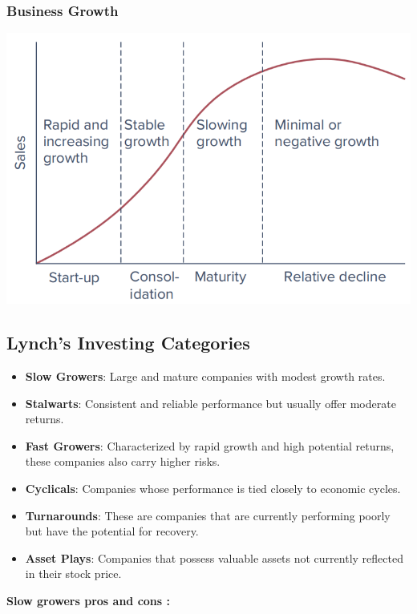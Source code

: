 \documentclass[
]{book}
\providecommand{\tightlist}{%
  \setlength{\itemsep}{0pt}\setlength{\parskip}{0pt}}
\begin{document}
\hypertarget{business-growth}{%
\subsubsection{Business Growth}\label{business-growth}}

\includegraphics{Resources/businesscycle.png}

\hypertarget{lynchs-investing-categories}{%
\subsection{Lynch's Investing Categories}\label{lynchs-investing-categories}}

\begin{itemize}
\tightlist
\item
  \textbf{Slow Growers}: Large and mature companies with modest growth rates.
\item
  \textbf{Stalwarts}: Consistent and reliable performance but usually offer moderate returns.
\item
  \textbf{Fast Growers}: Characterized by rapid growth and high potential returns, these companies also carry higher risks.
\item
  \textbf{Cyclicals}: Companies whose performance is tied closely to economic cycles.
\item
  \textbf{Turnarounds}: These are companies that are currently performing poorly but have the potential for recovery.
\item
  \textbf{Asset Plays}: Companies that possess valuable assets not currently reflected in their stock price.
\end{itemize}

\textbf{Slow growers pros and cons :}
\end{document}
